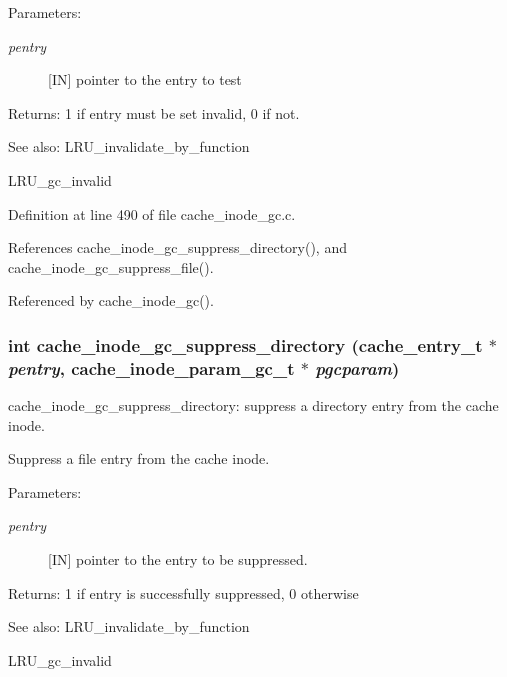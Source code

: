 \begin{Desc}
\item[Parameters:]
\begin{description}
\item[{\em pentry}][IN] pointer to the entry to test\end{description}
\end{Desc}
\begin{Desc}
\item[Returns:]1 if entry must be set invalid, 0 if not.\end{Desc}
\begin{Desc}
\item[See also:]LRU\_\-invalidate\_\-by\_\-function 

LRU\_\-gc\_\-invalid \end{Desc}


Definition at line 490 of file cache\_\-inode\_\-gc.c.

References cache\_\-inode\_\-gc\_\-suppress\_\-directory(), and cache\_\-inode\_\-gc\_\-suppress\_\-file().

Referenced by cache\_\-inode\_\-gc().
\subsubsection{\setlength{\rightskip}{0pt plus 5cm}int cache\_\-inode\_\-gc\_\-suppress\_\-directory (cache\_\-entry\_\-t $\ast$ {\em pentry}, cache\_\-inode\_\-param\_\-gc\_\-t $\ast$ {\em pgcparam})}\label{group__Cache__inode__gc__internal_ga3}


cache\_\-inode\_\-gc\_\-suppress\_\-directory: suppress a directory entry from the cache inode.

Suppress a file entry from the cache inode.

\begin{Desc}
\item[Parameters:]
\begin{description}
\item[{\em pentry}][IN] pointer to the entry to be suppressed.\end{description}
\end{Desc}
\begin{Desc}
\item[Returns:]1 if entry is successfully suppressed, 0 otherwise\end{Desc}
\begin{Desc}
\item[See also:]LRU\_\-invalidate\_\-by\_\-function 

LRU\_\-gc\_\-invalid \end{Desc}



